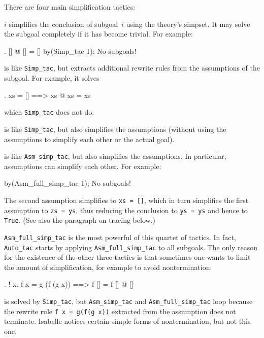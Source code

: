 There are four main simplification tactics:
\begin{ttdescription}
\item[\ttindexbold{Simp_tac} $i$] simplifies the conclusion of subgoal~$i$
  using the theory's simpset.  It may solve the subgoal completely if it has
  become trivial. For example:
\begin{ttbox}\makeatother
{. [] @ [] = []}
by(Simp_tac 1);
{\out No subgoals!}
\end{ttbox}

\item[\ttindexbold{Asm_simp_tac}]
  is like \verb$Simp_tac$, but extracts additional rewrite rules from
  the assumptions of the subgoal. For example, it solves
\begin{ttbox}\makeatother
{. xs = [] ==> xs @ xs = xs}
\end{ttbox}
which \texttt{Simp_tac} does not do.
  
\item[\ttindexbold{Full_simp_tac}] is like \verb$Simp_tac$, but also
  simplifies the assumptions (without using the assumptions to
  simplify each other or the actual goal).

\item[\ttindexbold{Asm_full_simp_tac}] is like \verb$Asm_simp_tac$,
  but also simplifies the assumptions. In particular, assumptions can
  simplify each other. For example:
\begin{ttbox}\makeatother
{}
by(Asm_full_simp_tac 1);
{\out No subgoals!}
\end{ttbox}
The second assumption simplifies to \texttt{xs = []}, which in turn
simplifies the first assumption to \texttt{zs = ys}, thus reducing the
conclusion to \texttt{ys = ys} and hence to \texttt{True}.
(See also the paragraph on tracing below.)
\end{ttdescription}
\texttt{Asm_full_simp_tac} is the most powerful of this quartet of
tactics. In fact, \texttt{Auto_tac} starts by applying
\texttt{Asm_full_simp_tac} to all subgoals. The only reason for the existence
of the other three tactics is that sometimes one wants to limit the amount of
simplification, for example to avoid nontermination:
\begin{ttbox}\makeatother
{. ! x. f x = g (f (g x)) ==> f [] = f [] @ []}
\end{ttbox}
is solved by \texttt{Simp_tac}, but \texttt{Asm_simp_tac} and
\texttt{Asm_full_simp_tac} loop because the rewrite rule \texttt{f x = g(f(g
x))} extracted from the assumption does not terminate.  Isabelle notices
certain simple forms of nontermination, but not this one.
 
